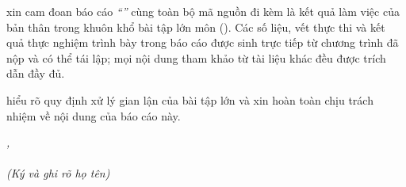 
\ChungToi{} xin cam đoan báo cáo \textit{``\TieuDe''} cùng toàn bộ mã nguồn đi kèm là kết
quả làm việc của bản thân trong khuôn khổ bài tập lớn môn \TenMon{} (\MaMon).
Các số liệu, vết thực thi và kết quả thực nghiệm trình bày trong báo cáo được sinh trực tiếp
từ chương trình đã nộp và có thể tái lập; mọi nội dung tham khảo từ tài liệu khác đều được
trích dẫn đầy đủ.

\ChungToi{} hiểu rõ quy định xử lý gian lận của bài tập lớn và xin hoàn toàn chịu trách
nhiệm về nội dung của báo cáo này.

\vspace{1.2cm}
\noindent\hfill
\begin{minipage}{0.48\linewidth}
  \centering
  \textit{\DiaDiem, \NgayKy}\\[4pt]
  \textbf{\NguoiThucHien}\\
  {\small\textit{(Ký và ghi rõ họ tên)}}\\[1.8cm]
  \textbf{}
\end{minipage}
